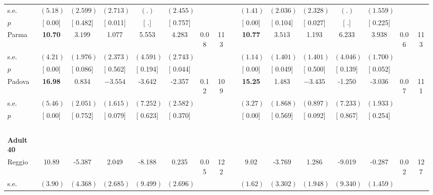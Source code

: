 \begin{longtable}{L{8em} c c c c c c c p{1em} c c c c c c c}
\quad \quad \quad \quad s.e.& $ (     5.18)$ & $ (    2.599)$ & $ (    2.713)$ & $ (        .)$ & $ (    2.455)$ & & & & $ (     1.41)$ & $ (    2.036)$ & $ (    2.328)$ & $ (        .)$ & $ (    1.559)$ & &  \\*
\quad \quad \quad \quad $ p$ & [     0.00] & [    0.482] & [    0.011] & [        .] & [    0.757] & & & & [     0.00] & [    0.104] & [    0.027] & [        .] & [    0.225] & &  \\[1em]
\quad \quad \quad Parma& \textbf{    10.70} & $ \mathbf{    3.199}$ &     1.077 &     5.553 & $ \mathbf{    4.283}$ &      0.08 &       113 & & \textbf{    10.77} & $ \mathbf{    3.513}$ &     1.193 &     6.233 & $ \mathbf{    3.938}$ &      0.06 &       113  \\*
\quad \quad \quad \quad s.e.& $ (     4.21)$ & $ (    1.976)$ & $ (    2.373)$ & $ (    4.591)$ & $ (    2.743)$ & & & & $ (     1.14)$ & $ (    1.401)$ & $ (    1.401)$ & $ (    4.046)$ & $ (    1.700)$ & &  \\*
\quad \quad \quad \quad $ p$ & [     0.00] & [    0.086] & [    0.562] & [    0.194] & [    0.044] & & & & [     0.00] & [    0.049] & [    0.500] & [    0.139] & [    0.052] & &  \\[1em]
\quad \quad \quad Padova& \textbf{    16.98} &     0.834 & $ \mathbf{   -3.554}$ &    -3.642 &    -2.357 &      0.12 &       109 & & \textbf{    15.25} &     1.483 & $ \mathbf{   -3.435}$ &    -1.250 &    -3.036 &      0.07 &       111  \\*
\quad \quad \quad \quad s.e.& $ (     5.46)$ & $ (    2.051)$ & $ (    1.615)$ & $ (    7.252)$ & $ (    2.582)$ & & & & $ (     3.27)$ & $ (    1.868)$ & $ (    0.897)$ & $ (    7.233)$ & $ (    1.933)$ & &  \\*
\quad \quad \quad \quad $ p$ & [     0.00] & [    0.752] & [    0.079] & [    0.623] & [    0.370] & & & & [     0.00] & [    0.569] & [    0.092] & [    0.867] & [    0.254] & &  \\[1em]
~\\[1em]
\quad \quad \textbf{Adult 40} & & & & & & & & & & & & & & & \\* 
\quad \quad \quad Reggio& 10.89 &    -5.387 &     2.049 &    -8.188 &     0.235 &      0.05 &       122 & & 9.02 &    -3.769 &     1.286 &    -9.019 &    -0.287 &      0.02 &       127  \\*
\quad \quad \quad \quad s.e.& $ (     3.90)$ & $ (    4.368)$ & $ (    2.685)$ & $ (    9.499)$ & $ (    2.696)$ & & & & $ (     1.62)$ & $ (    3.302)$ & $ (    1.948)$ & $ (    9.340)$ & $ (    1.459)$ & &  \\*

\end{longtable}
